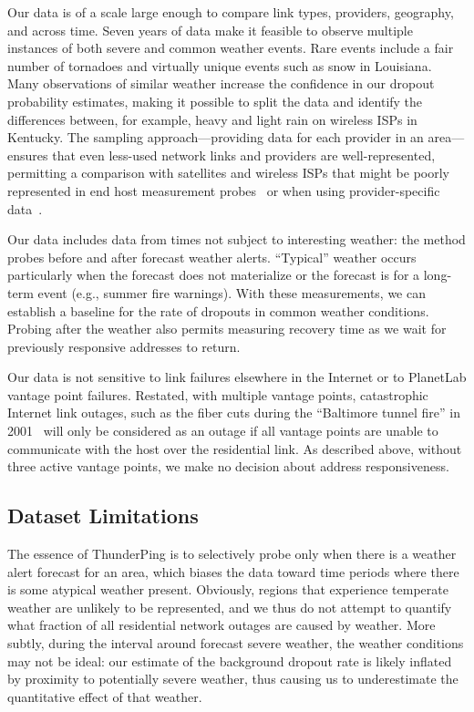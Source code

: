 Our data is of a scale large enough to compare link
types, providers, geography, and across time.  Seven years
of data make it feasible to observe multiple instances of
both severe and common weather events.  Rare events include
a fair number of tornadoes and virtually unique events such
as snow in Louisiana.  Many observations of similar weather
increase the confidence in our dropout probability estimates,
making it possible to split the data and identify the differences
between, for example, heavy and light rain on wireless ISPs in
Kentucky.  The sampling approach---providing data for each 
provider in an area---ensures that even less-used network links
and providers are well-represented, permitting a comparison with
satellites and wireless ISPs that might be poorly represented
in end host measurement probes~\cite{samknows, sundaresan-sigcomm11,
  ripe-atlas} or when using provider-specific
data~\cite{conext10-jin,cisco-transponder,alpha-transponder}.

Our data includes data from times not subject to interesting
weather: the method probes before and after forecast weather
alerts.  ``Typical'' weather occurs particularly when the
forecast does not materialize or the forecast is for a
long-term event (e.g., summer fire warnings).  With these
measurements, we can establish a baseline for the rate of
dropouts in common weather conditions.  Probing after the
weather also permits measuring recovery time as we wait for
previously responsive addresses to return.

Our data is not sensitive to link failures elsewhere in the
Internet or to PlanetLab vantage point failures.
Restated, with multiple vantage points, catastrophic Internet link outages,
such as the fiber cuts during the ``Baltimore tunnel fire'' in
2001~\cite{bmore-tunnel-fire} will only be considered as an outage if all
vantage points are unable to communicate with the host over the residential
link.  As described above, without three active vantage points,
we make no decision about address responsiveness.

\subsection{Dataset Limitations} %
\label{sec:datasux}

%
The essence of ThunderPing is to selectively probe only when
there is a weather alert forecast for an area, which biases the data
toward time periods where there is some atypical weather present.
Obviously, regions that experience temperate weather are 
unlikely to be represented, and we thus do not attempt to quantify
what fraction of all residential network outages are caused by weather.
More subtly, during the interval around
forecast severe weather, the weather conditions may not be
ideal: our estimate of the background dropout rate is likely inflated 
by proximity to potentially severe weather, thus causing us to underestimate
the quantitative effect of that weather.

